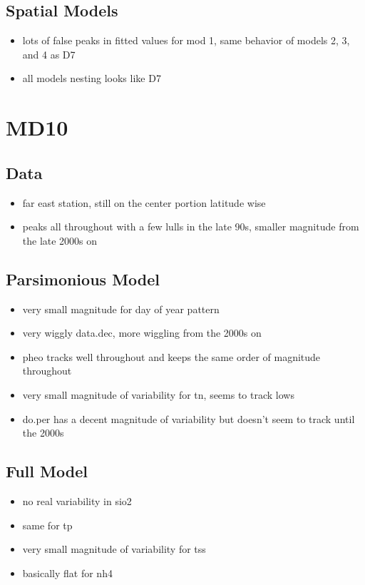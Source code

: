 \documentclass[12pt]{amsart}
\begin{document}
\subsection{Spatial Models}

\begin{itemize}
\item lots of false peaks in fitted values for mod 1, same behavior of models 2, 3, and 4 as D7
\item all models nesting looks like D7 
\end{itemize}

\section{MD10}
\subsection{Data}
\begin{itemize}
\item far east station, still on the center portion latitude wise
\item peaks all throughout with a few lulls in the late 90s, smaller magnitude from the late 2000s on
\end{itemize}
\subsection{Parsimonious Model}
\begin{itemize}
\item very small magnitude for day of year pattern
\item very wiggly data.dec, more wiggling from the 2000s on
\item pheo tracks well throughout and keeps the same order of magnitude throughout
\item very small magnitude of variability for tn, seems to track lows
\item do.per has a decent magnitude of variability but doesn't seem to track until the 2000s
\end{itemize}
\subsection{Full Model}
\begin{itemize}
\item no real variability in sio2
\item same for tp
\item very small magnitude of variability for tss
\item basically flat for nh4
\end{itemize}
\end{document}
